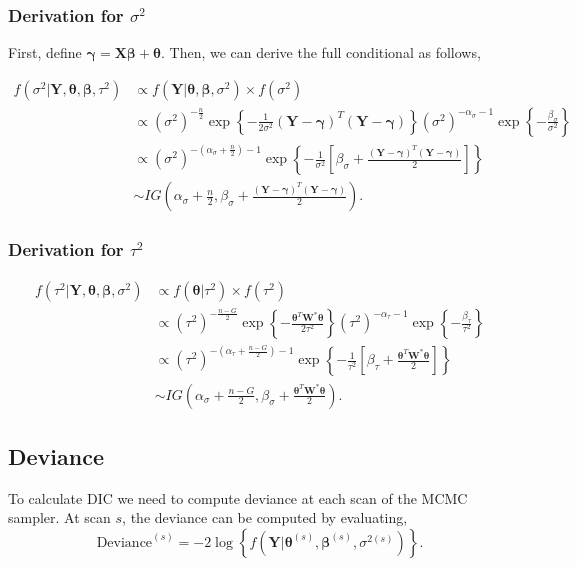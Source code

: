 \documentclass[12pt]{article} %
\theoremstyle{plain}
\theoremstyle{definition}
\theoremstyle{remark}
\begin{document}
\subsubsection*{Derivation for $\sigma^2$}

First, define $\boldsymbol{\gamma}=\mathbf{X}\boldsymbol{\beta}+\boldsymbol{\theta}$. Then, we can derive the full conditional as follows,

\begin{align*}
f\left(\sigma^2|\mathbf{Y},\boldsymbol{\theta},\boldsymbol{\beta},\tau^2\right) &\propto f\left(\mathbf{Y}|\boldsymbol{\theta},\boldsymbol{\beta},\sigma^2\right) \times f\left(\sigma^2\right)\\
&\propto \left(\sigma^2\right)^{-\frac{n}{2}}\exp\left\{-\frac{1}{2\sigma^2}\left(\mathbf{Y}-\boldsymbol{\gamma}\right)^T\left(\mathbf{Y}-\boldsymbol{\gamma}\right)\right\} \left(\sigma^2\right)^{-\alpha_{\sigma}-1} \exp\left\{-\frac{\beta_{\sigma}}{\sigma^2}\right\}\\
&\propto \left(\sigma^2\right)^{-\left(\alpha_{\sigma}+\frac{n}{2}\right)-1}\exp\left\{-\frac{1}{\sigma^2}\left[\beta_{\sigma}+\frac{\left(\mathbf{Y}-\boldsymbol{\gamma}\right)^T\left(\mathbf{Y}-\boldsymbol{\gamma}\right)}{2}\right]\right\}\\
&\sim IG\left(\alpha_{\sigma}+\frac{n}{2},\beta_{\sigma}+\frac{\left(\mathbf{Y}-\boldsymbol{\gamma}\right)^T\left(\mathbf{Y}-\boldsymbol{\gamma}\right)}{2}\right).
\end{align*}

\subsubsection*{Derivation for $\tau^2$}

\begin{align*}
f\left(\tau^2|\mathbf{Y},\boldsymbol{\theta},\boldsymbol{\beta},\sigma^2\right) &\propto f\left(\boldsymbol{\theta}|\tau^2\right) \times f\left(\tau^2\right)\\
&\propto \left(\tau^2\right)^{-\frac{n-G}{2}}\exp\left\{-\frac{\boldsymbol{\theta}^T \mathbf{W}^*\boldsymbol{\theta}}{2\tau^2}\right\} \left(\tau^2\right)^{-\alpha_{\tau}-1} \exp\left\{-\frac{\beta_{\tau}}{\tau^2}\right\}\\
&\propto \left(\tau^2\right)^{-\left(\alpha_{\tau}+\frac{n-G}{2}\right)-1}\exp\left\{-\frac{1}{\tau^2}\left[\beta_{\tau}+\frac{\boldsymbol{\theta}^T \mathbf{W}^*\boldsymbol{\theta}}{2}\right]\right\}\\
&\sim IG\left(\alpha_{\sigma}+\frac{n-G}{2},\beta_{\sigma}+\frac{\boldsymbol{\theta}^T \mathbf{W}^*\boldsymbol{\theta}}{2}\right).
\end{align*}

\subsection*{Deviance}

To calculate DIC we need to compute deviance at each scan of the MCMC sampler. At scan $s$, the deviance can be computed by evaluating, 
$$\text{Deviance}^{(s)}=-2\log\left\{f\left(\mathbf{Y}\Big|\boldsymbol{\theta}^{(s)},\boldsymbol{\beta}^{(s)},\sigma^{2(s)}\right)\right\}.$$
\end{document}
